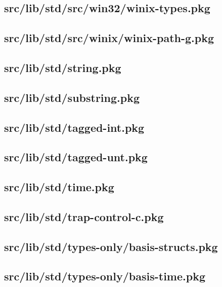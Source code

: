 \subsection{src/lib/std/src/win32/winix-types.pkg}


\subsection{src/lib/std/src/winix/winix-path-g.pkg}


\subsection{src/lib/std/string.pkg}


\subsection{src/lib/std/substring.pkg}


\subsection{src/lib/std/tagged-int.pkg}


\subsection{src/lib/std/tagged-unt.pkg}


\subsection{src/lib/std/time.pkg}


\subsection{src/lib/std/trap-control-c.pkg}


\subsection{src/lib/std/types-only/basis-structs.pkg}


\subsection{src/lib/std/types-only/basis-time.pkg}


